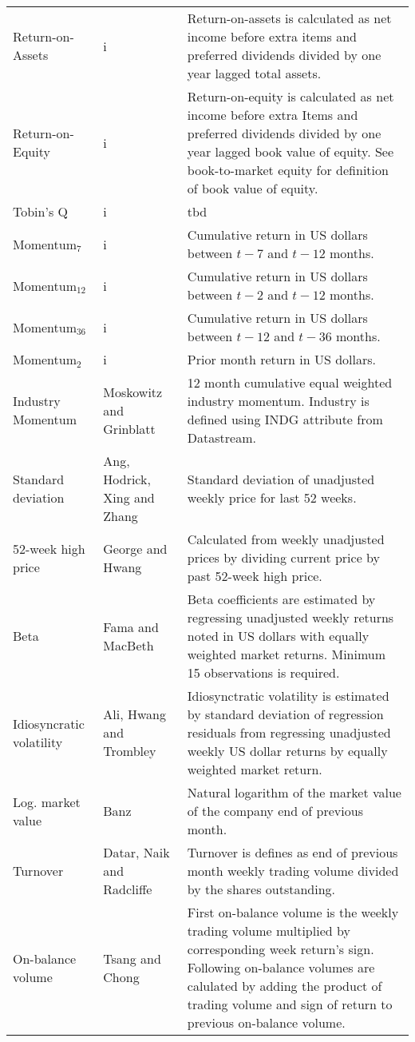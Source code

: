 \documentclass{article}
\begin{document}
{{\begin{xltabular}{\textwidth}{l p{0.2\textwidth} X}
Return-on-Assets 		& i									& Return-on-assets is calculated as net income before extra items and preferred dividends divided by one year lagged total assets.\\
Return-on-Equity 		& i									& Return-on-equity is calculated as net income before extra Items and preferred dividends divided by one year lagged book value of equity. See book-to-market equity for definition of book value of equity. \\
Tobin's Q 				& i									& tbd\\
Momentum$_{7}$ 		& i									& Cumulative return in US dollars between $t-7$ and $t-12$ months.\\
Momentum$_{12}$ 		& i									& Cumulative return in US dollars between $t-2$ and $t-12$ months.\\
Momentum$_{36}$ 		& i									& Cumulative return in US dollars between $t-12$ and $t-36$ months.\\
Momentum$_{2}$ 		& i									& Prior month return in US dollars.\\ 
Industry Momentum		& Moskowitz and Grinblatt \citeyear{Moskowitz1999}	 & 12 month cumulative equal weighted industry momentum. Industry is defined using INDG attribute from Datastream. \\
Standard deviation		& Ang, Hodrick, Xing and Zhang \citeyear{ang2006}	& Standard deviation of unadjusted weekly price for last 52 weeks. \\ 
52-week high price		& George and Hwang \citeyear{george2004}	& Calculated from weekly unadjusted prices by dividing current price by past 52-week high price. \\
Beta					& Fama and MacBeth \citeyear{FamaMacBeth1973}	& Beta coefficients are estimated by regressing unadjusted weekly returns noted in US dollars with equally weighted market returns. Minimum 15 observations is required.\\
Idiosyncratic volatility	& Ali, Hwang and Trombley \citeyear{ali2003}	& Idiosynctratic volatility is estimated by standard deviation of regression residuals from regressing unadjusted weekly US dollar returns by equally weighted market return. \\
Log. market value		& Banz \citeyear{BANZ1981}				& Natural logarithm of the market value of the company end of previous month.\\
Turnover				& Datar, Naik and Radcliffe \citeyear{datar1998}									& Turnover is defines as end of previous month weekly trading volume divided by the shares outstanding. \\
On-balance volume		& Tsang and Chong \citeyear{tsang2009}									& First on-balance volume is the weekly trading volume multiplied by corresponding week return's sign. Following on-balance volumes are calulated by adding the product of trading volume and sign of return to previous on-balance volume.\\ 
\bottomrule
\end{xltabular}
}}
\end{document}
